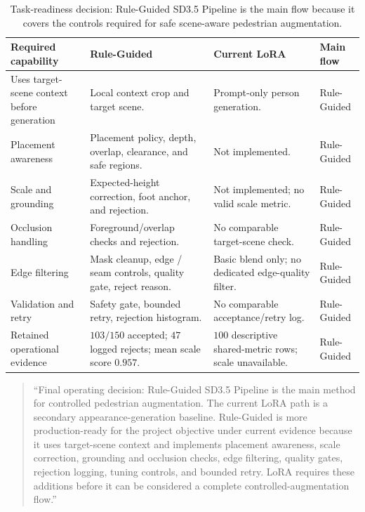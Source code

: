 \documentclass[11pt,a4paper]{article}
\begin{document}
\begin{table}[t]
  \centering
  \caption[Task-readiness decision]{{Task-readiness decision:} Rule-Guided SD3.5 Pipeline is the main flow because it covers the controls required for safe scene-aware pedestrian augmentation.}
  \label{tab:method-decision}
  \scriptsize
  \begin{tabular}{@{}p{3.0cm}p{2.9cm}p{2.9cm}p{1.1cm}@{}}
    \toprule
    \textbf{Required capability} & \textbf{Rule-Guided} & \textbf{Current LoRA} & \textbf{Main flow} \\
    \midrule
    Uses target-scene context before generation & Local context crop and target scene. & Prompt-only person generation. & Rule-Guided \\
    Placement awareness & Placement policy, depth, overlap, clearance, and safe regions. & Not implemented. & Rule-Guided \\
    Scale and grounding & Expected-height correction, foot anchor, and rejection. & Not implemented; no valid scale metric. & Rule-Guided \\
    Occlusion handling & Foreground/overlap checks and rejection. & No comparable target-scene check. & Rule-Guided \\
    Edge filtering & Mask cleanup, edge / seam controls, quality gate, reject reason. & Basic blend only; no dedicated edge-quality filter. & Rule-Guided \\
    Validation and retry & Safety gate, bounded retry, rejection histogram. & No comparable acceptance/retry log. & Rule-Guided \\
    Retained operational evidence & $103/150$ accepted; $47$ logged rejects; mean scale score $0.957$. & $100$ descriptive shared-metric rows; scale unavailable. & Rule-Guided \\
    \bottomrule
  \end{tabular}
\end{table}

\begin{quote}
``Final operating decision: Rule-Guided SD3.5 Pipeline is the main method for controlled pedestrian augmentation. The current LoRA path is a secondary appearance-generation baseline. Rule-Guided is more production-ready for the project objective under current evidence because it uses target-scene context and implements placement awareness, scale correction, grounding and occlusion checks, edge filtering, quality gates, rejection logging, tuning controls, and bounded retry. LoRA requires these additions before it can be considered a complete controlled-augmentation flow.''
\end{quote}
\end{document}
